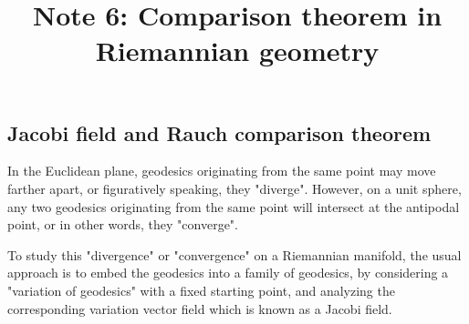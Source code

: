 \documentclass{ctexart}
\title{Note 6: Comparison theorem in Riemannian geometry}
\date{} %
\begin{document}
\maketitle

\subsection*{Jacobi field and Rauch comparison theorem}

In the Euclidean plane, geodesics originating from the same point may move farther apart, or figuratively speaking, they "diverge". However, on a unit sphere, 
any two geodesics originating from the same point will intersect at the antipodal point, or in other words, they "converge".

To study this "divergence" or "convergence" on a Riemannian manifold, the usual approach is to embed the geodesics into a family of geodesics, 
by considering a "variation of geodesics" with a fixed starting point, and analyzing the corresponding variation vector field which is known as a Jacobi field. 
\end{document}
